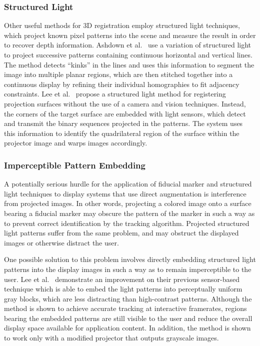 \documentclass{thesis}
\begin{document}
\subsubsection{Structured Light}

Other useful methods for 3D registration employ structured light techniques, which project known pixel patterns into the scene and measure the result in order to recover depth information. Ashdown et al.~\cite{Ashdown2004} use a variation of structured light to project successive patterns containing continuous horizontal and vertical lines. The method detects ``kinks'' in the lines and uses this information to segment the image into multiple planar regions, which are then stitched together into a continuous display by refining their individual homographies to fit adjacency constraints. Lee et al.~\cite{Lee2004} propose a structured light method for registering projection surfaces without the use of a camera and vision techniques. Instead, the corners of the target surface are embedded with light sensors, which detect and transmit the binary sequences projected in the patterns. The system uses this information to identify the quadrilateral region of the surface within the projector image and warps images accordingly. 

\subsubsection{Imperceptible Pattern Embedding}

A potentially serious hurdle for the application of fiducial marker and structured light techniques to display systems that use direct augmentation is interference from projected images. In other words, projecting a colored image onto a surface bearing a fiducial marker may obscure the pattern of the marker in such a way as to prevent correct identification by the tracking algorithm. Projected structured light patterns suffer from the same problem, and may obstruct the displayed images or otherwise distract the user. 

One possible solution to this problem involves directly embedding structured light patterns into the display images in such a way as to remain imperceptible to the user. Lee et al.~\cite{Lee2005} demonstrate an improvement on their previous sensor-based technique which is able to embed the light patterns into perceptually uniform gray blocks, which are less distracting than high-contrast patterns. Although the method is shown to achieve accurate tracking at interactive framerates, regions bearing the embedded patterns are still visible to the user and reduce the overall display space available for application content. In addition, the method is shown to work only with a modified projector that outputs grayscale images.
\end{document}
